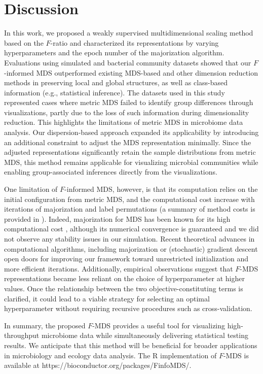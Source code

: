 \documentclass[10pt,letterpaper]{article}
\newcommand{\1}{{\rm 1}\kern-0.24em{\rm I}}
\begin{document}
\section*{Discussion}
In this work, we proposed a weakly supervised multidimensional scaling method based on the $F$-ratio and characterized its representations by varying hyperparameters and the epoch number of the majorization algorithm. Evaluations using simulated and bacterial community datasets showed that our $F$-informed MDS outperformed existing MDS-based and other dimension reduction methods in preserving local and global structures, as well as class-based information (e.g., statistical inference). The datasets used in this study represented cases where metric MDS failed to identify group differences through visualizations, partly due to the loss of such information during dimensionality reduction. This highlights the limitations of metric MDS in microbiome data analysis. Our dispersion-based approach expanded its applicability by introducing an additional constraint to adjust the MDS representation minimally. Since the adjusted representations significantly retain the sample distributions from metric MDS, this method remains applicable for visualizing microbial communities while enabling group-associated inferences directly from the visualizations.

One limitation of $F$-informed MDS, however, is that its computation relies on the initial configuration from metric MDS, and the computational cost increase with iterations of majorization and label permutations (a summary of method costs is provided in ). Indeed, majorization for MDS has been known for its high computational cost \cite{Fang25}, although its numerical convergence is guaranteed \cite{deleeuw24} and we did not observe any stability issues in our simulation. Recent theoretical advances in computational algorithms, including majorization \cite{Streeter23} or (stochastic) gradient descent \cite{Demaine21, zheng19} open doors for improving our framework toward unrestricted initialization and more efficient iterations. Additionally, empirical observations suggest that $F$-MDS representations became less reliant on the choice of hyperparameter at higher values. Once the relationship between the two objective-constituting terms is clarified, it could lead to a viable strategy for selecting an optimal hyperparameter without requiring recursive procedures such as cross-validation.

In summary, the proposed $F$-MDS provides a useful tool for visualizing high-throughput microbiome data while simultaneously delivering statistical testing results. We anticipate that this method will be beneficial for broader applications in microbiology and ecology data analysis. The R implementation of $F$-MDS is available at https://bioconductor.org/packages/FinfoMDS/.
\end{document}
